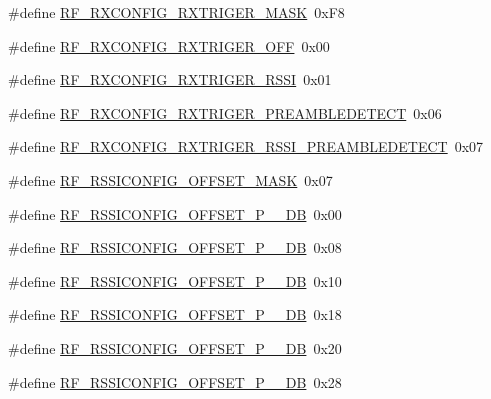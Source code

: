 \begin{DoxyCompactItemize}
\#define \hyperlink{sx1276Regs-Fsk_8h_a6484d9c4b47e7a5860ad4d2ffa85f7fc}{R\+F\+\_\+\+R\+X\+C\+O\+N\+F\+I\+G\+\_\+\+R\+X\+T\+R\+I\+G\+E\+R\+\_\+\+M\+A\+SK}~0x\+F8
\item 
\#define \hyperlink{sx1276Regs-Fsk_8h_ab7bc69d7042e25e9e1c38cc4a82d5510}{R\+F\+\_\+\+R\+X\+C\+O\+N\+F\+I\+G\+\_\+\+R\+X\+T\+R\+I\+G\+E\+R\+\_\+\+O\+FF}~0x00
\item 
\#define \hyperlink{sx1276Regs-Fsk_8h_a9c49c770ce3e8a7629c47d1c1485a9b3}{R\+F\+\_\+\+R\+X\+C\+O\+N\+F\+I\+G\+\_\+\+R\+X\+T\+R\+I\+G\+E\+R\+\_\+\+R\+S\+SI}~0x01
\item 
\#define \hyperlink{sx1276Regs-Fsk_8h_a46818be362acfd8e971b2ba909a5bd48}{R\+F\+\_\+\+R\+X\+C\+O\+N\+F\+I\+G\+\_\+\+R\+X\+T\+R\+I\+G\+E\+R\+\_\+\+P\+R\+E\+A\+M\+B\+L\+E\+D\+E\+T\+E\+CT}~0x06
\item 
\#define \hyperlink{sx1276Regs-Fsk_8h_ac0fb8096e173b7862b65d689a21a8d57}{R\+F\+\_\+\+R\+X\+C\+O\+N\+F\+I\+G\+\_\+\+R\+X\+T\+R\+I\+G\+E\+R\+\_\+\+R\+S\+S\+I\+\_\+\+P\+R\+E\+A\+M\+B\+L\+E\+D\+E\+T\+E\+CT}~0x07
\item 
\#define \hyperlink{sx1276Regs-Fsk_8h_a699dac31bce270b1076bcf3026d007db}{R\+F\+\_\+\+R\+S\+S\+I\+C\+O\+N\+F\+I\+G\+\_\+\+O\+F\+F\+S\+E\+T\+\_\+\+M\+A\+SK}~0x07
\item 
\#define \hyperlink{sx1276Regs-Fsk_8h_aa354cb5789ab8e09067569f67a359440}{R\+F\+\_\+\+R\+S\+S\+I\+C\+O\+N\+F\+I\+G\+\_\+\+O\+F\+F\+S\+E\+T\+\_\+\+P\+\_\+\_\+\+DB}~0x00
\item 
\#define \hyperlink{sx1276Regs-Fsk_8h_a0a3e7708d76f93e58d8edd106f1a2276}{R\+F\+\_\+\+R\+S\+S\+I\+C\+O\+N\+F\+I\+G\+\_\+\+O\+F\+F\+S\+E\+T\+\_\+\+P\+\_\+\_\+\+DB}~0x08
\item 
\#define \hyperlink{sx1276Regs-Fsk_8h_a353ff92327056e55a727979d6a82e27a}{R\+F\+\_\+\+R\+S\+S\+I\+C\+O\+N\+F\+I\+G\+\_\+\+O\+F\+F\+S\+E\+T\+\_\+\+P\+\_\+\_\+\+DB}~0x10
\item 
\#define \hyperlink{sx1276Regs-Fsk_8h_a94023f7a527573099d0c794d75c9d808}{R\+F\+\_\+\+R\+S\+S\+I\+C\+O\+N\+F\+I\+G\+\_\+\+O\+F\+F\+S\+E\+T\+\_\+\+P\+\_\+\_\+\+DB}~0x18
\item 
\#define \hyperlink{sx1276Regs-Fsk_8h_aea0ec0438ba56a524841136e5237f4ad}{R\+F\+\_\+\+R\+S\+S\+I\+C\+O\+N\+F\+I\+G\+\_\+\+O\+F\+F\+S\+E\+T\+\_\+\+P\+\_\+\_\+\+DB}~0x20
\item 
\#define \hyperlink{sx1276Regs-Fsk_8h_a3c460ec9034b813510375d7c2e111141}{R\+F\+\_\+\+R\+S\+S\+I\+C\+O\+N\+F\+I\+G\+\_\+\+O\+F\+F\+S\+E\+T\+\_\+\+P\+\_\+\_\+\+DB}~0x28
\item 

\end{DoxyCompactItemize}

